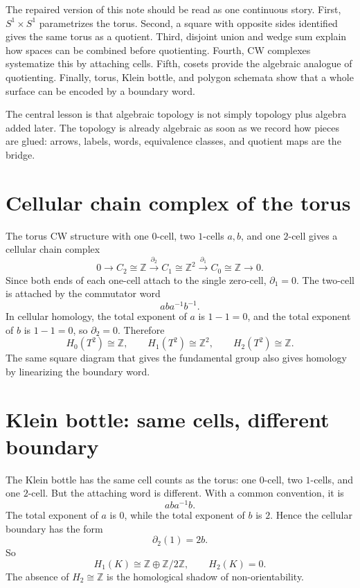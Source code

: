 The repaired version of this note should be read as one continuous story.  First, $S^1\times S^1$ parametrizes the torus.  Second, a square with opposite sides identified gives the same torus as a quotient.  Third, disjoint union and wedge sum explain how spaces can be combined before quotienting.  Fourth, CW complexes systematize this by attaching cells.  Fifth, cosets provide the algebraic analogue of quotienting.  Finally, torus, Klein bottle, and polygon schemata show that a whole surface can be encoded by a boundary word.

The central lesson is that algebraic topology is not simply topology plus algebra added later.  The topology is already algebraic as soon as we record how pieces are glued: arrows, labels, words, equivalence classes, and quotient maps are the bridge.

\section{Cellular chain complex of the torus}

The torus CW structure with one \(0\)-cell, two \(1\)-cells \(a,b\), and one \(2\)-cell gives a cellular chain complex
\[
  0\to C_2\cong\mathbb Z
  \xrightarrow{\partial_2}
  C_1\cong\mathbb Z^2
  \xrightarrow{\partial_1}
  C_0\cong\mathbb Z\to0.
\]
Since both ends of each one-cell attach to the single zero-cell, \(\partial_1=0\).  The two-cell is attached by the commutator word
\[
  aba^{-1}b^{-1}.
\]
In cellular homology, the total exponent of \(a\) is \(1-1=0\), and the total exponent of \(b\) is \(1-1=0\), so \(\partial_2=0\).  Therefore
\[
  H_0(T^2)\cong\mathbb Z,\qquad
  H_1(T^2)\cong\mathbb Z^2,\qquad
  H_2(T^2)\cong\mathbb Z.
\]
The same square diagram that gives the fundamental group also gives homology by linearizing the boundary word.

\section{Klein bottle: same cells, different boundary}

The Klein bottle has the same cell counts as the torus: one \(0\)-cell, two \(1\)-cells, and one \(2\)-cell.  But the attaching word is different.  With a common convention, it is
\[
  aba^{-1}b.
\]
The total exponent of \(a\) is \(0\), while the total exponent of \(b\) is \(2\).  Hence the cellular boundary has the form
\[
  \partial_2(1)=2b.
\]
So
\[
  H_1(K)\cong \mathbb Z\oplus \mathbb Z/2\mathbb Z,\qquad
  H_2(K)=0.
\]
The absence of \(H_2\cong\mathbb Z\) is the homological shadow of non-orientability.

